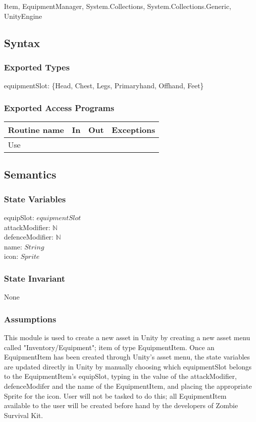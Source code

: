 \documentclass[12pt]{article}
\begin{document}
Item, EquipmentManager, System.Collections, System.Collections.Generic, UnityEngine

\subsection* {Syntax}

\subsubsection* {Exported Types}

equipmentSlot: \{Head, Chest, Legs, Primaryhand, Offhand, Feet\}

\subsubsection* {Exported Access Programs}

\begin{tabular}{| l | l | l | l |}
\hline
\textbf{Routine name} & \textbf{In} & \textbf{Out} & \textbf{Exceptions}\\
\hline
Use & ~ & ~ & ~\\
\hline
\end{tabular}

\subsection* {Semantics}

\subsubsection* {State Variables}

equipSlot: $equipmentSlot$\\
attackModifier: $\mathbb{N}$\\
defenceModifier: $\mathbb{N}$\\
name: $String$\\
icon: $Sprite$

\subsubsection* {State Invariant}

None

\subsubsection* {Assumptions}

This module is used to create a new asset in Unity by creating a new asset menu called "Inventory/Equipment"; item of type EquipmentItem. Once an EquipmentItem has been created through Unity's asset menu, the state variables are updated directly in Unity by manually choosing which equipmentSlot belongs to the EquipmentItem's equipSlot, typing in the value of the attackModifier, defenceModifer and the name of the EquipmentItem, and placing the appropriate Sprite for the icon. User will not be tasked to do this; all EquipmentItem available to the user will be created before hand by the developers of Zombie Survival Kit.
\end{document}
